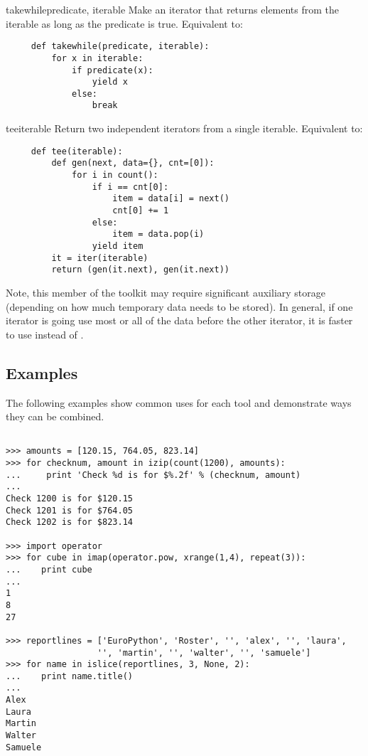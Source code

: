 \begin{funcdesc}{takewhile}{predicate, iterable}
  Make an iterator that returns elements from the iterable as long as
  the predicate is true.  Equivalent to:

  \begin{verbatim}
     def takewhile(predicate, iterable):
         for x in iterable:
             if predicate(x):
                 yield x
             else:
                 break
  \end{verbatim}
\end{funcdesc}

\begin{funcdesc}{tee}{iterable}
  Return two independent iterators from a single iterable.
  Equivalent to:

  \begin{verbatim}
     def tee(iterable):
         def gen(next, data={}, cnt=[0]):
             for i in count():
                 if i == cnt[0]:
                     item = data[i] = next()
                     cnt[0] += 1
                 else:
                     item = data.pop(i)
                 yield item
         it = iter(iterable)
         return (gen(it.next), gen(it.next))
  \end{verbatim}

  Note, this member of the toolkit may require significant auxiliary
  storage (depending on how much temporary data needs to be stored).
  In general, if one iterator is going use most or all of the data before
  the other iterator, it is faster to use  instead of
  .
\end{funcdesc}


\subsection{Examples \label{itertools-example}}

The following examples show common uses for each tool and
demonstrate ways they can be combined.

\begin{verbatim}

>>> amounts = [120.15, 764.05, 823.14]
>>> for checknum, amount in izip(count(1200), amounts):
...     print 'Check %d is for $%.2f' % (checknum, amount)
...
Check 1200 is for $120.15
Check 1201 is for $764.05
Check 1202 is for $823.14

>>> import operator
>>> for cube in imap(operator.pow, xrange(1,4), repeat(3)):
...    print cube
...
1
8
27

>>> reportlines = ['EuroPython', 'Roster', '', 'alex', '', 'laura',
                  '', 'martin', '', 'walter', '', 'samuele']
>>> for name in islice(reportlines, 3, None, 2):
...    print name.title()
...
Alex
Laura
Martin
Walter
Samuele

\end{verbatim}

